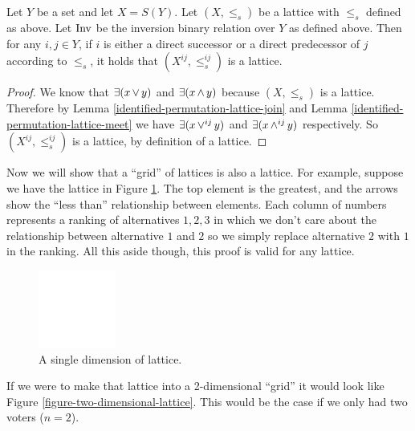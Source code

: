 	\begin{proposition}
		\label{proposition-identification-is-lattice}
		Let $Y$ be a set and let $X = S(Y)$. Let $(X, \le_s)$ be a lattice with $\le_s$ defined as above. Let $\operatorname{Inv}$ be the inversion binary relation over $Y$ as defined above. Then for any $i,j \in Y$, if $i$ is either a direct successor or a direct predecessor of $j$ according to $\le_s$, it holds that $(X^{ij}, \le^{ij}_s)$ is a lattice.
	\end{proposition}

	\begin{proof}
		We know that $\exists(x \operatorname{\vee} y)$ and $\exists(x \operatorname{\wedge} y)$ because $(X, \le_s)$ is a lattice. Therefore by Lemma \ref{identified-permutation-lattice-join} and Lemma \ref{identified-permutation-lattice-meet} we have $\exists(x \operatorname{\vee}^{ij} y)$ and $\exists(x \operatorname{\wedge}^{ij} y)$ respectively. So $(X^{ij}, \le^{ij}_s)$ is a lattice, by definition of a lattice.
	\end{proof}

	Now we will show that a ``grid'' of lattices is also a lattice. For example, suppose we have the lattice in Figure \ref{figure-one-dimensional-lattice}. The top element is the greatest, and the arrows show the ``less than'' relationship between elements. Each column of numbers represents a ranking of alternatives ${1, 2, 3}$ in which we don't care about the relationship between alternative $1$ and $2$ so we simply replace alternative $2$ with $1$ in the ranking. All this aside though, this proof is valid for any lattice.

	\begin{figure}[ht]
		\begin{center}
			\includegraphics[width=1in]{../figures/diagram5.pdf}
			\caption{A single dimension of lattice.}
			\label{figure-one-dimensional-lattice}
		\end{center}
	\end{figure}

	If we were to make that lattice into a 2-dimensional ``grid'' it would look like Figure \ref{figure-two-dimensional-lattice}. This would be the case if we only had two voters ($n = 2$).

